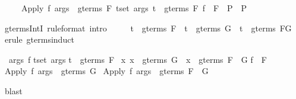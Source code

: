\begin{isabellebody}
\begin{isamarkuptext}
\begin{isabelle}%
\ \ \ \ \ {\isasymlbrakk}Apply\ f\ args\ {\isasymin}\ gterms\ F{\isacharsemicolon}\ {\isasymlbrakk}{\isasymforall}t{\isasymin}set\ args{\isachardot}\ t\ {\isasymin}\ gterms\ F{\isacharsemicolon}\ f\ {\isasymin}\ F{\isasymrbrakk}\ {\isasymLongrightarrow}\ P{\isasymrbrakk}\ {\isasymLongrightarrow}\ P%
\end{isabelle}
%
\end{isamarkuptext}%
\isamarkuptrue%
\isamarkupfalse%
\ gterms{\isacharunderscore}IntI\ {\isacharbrackleft}rule{\isacharunderscore}format{\isacharcomma}\ intro{\isacharbang}{\isacharbrackright}{\isacharcolon}\isanewline
\ \ \ \ \ {\isachardoublequoteopen}t\ {\isasymin}\ gterms\ F\ {\isasymLongrightarrow}\ t\ {\isasymin}\ gterms\ G\ {\isasymlongrightarrow}\ t\ {\isasymin}\ gterms\ {\isacharparenleft}F{\isasyminter}G{\isacharparenright}{\isachardoublequoteclose}\isanewline
%
\isadelimproof
%
\endisadelimproof
%
\isatagproof
{}\isamarkupfalse%
\ {\isacharparenleft}erule\ gterms{\isachardot}induct{\isacharparenright}%
\begin{isamarkuptxt}%
\begin{isabelle}%
\ {}{\isachardot}\ {\isasymAnd}args\ f{\isachardot}\isanewline
{}t{\isasymin}set\ args{\isachardot}\isanewline
{}t\ {\isasymin}\ gterms\ F\ {\isasyminter}\isanewline
{}x{\isachardot}\ x\ {\isasymin}\ gterms\ G\ {\isasymlongrightarrow}\ x\ {\isasymin}\ gterms\ {\isacharparenleft}F\ {\isasyminter}\ G{\isacharparenright}{\isacharbraceright}{\isacharsemicolon}\isanewline
{}f\ {\isasymin}\ F{\isasymrbrakk}\isanewline
{}\ Apply\ f\ args\ {\isasymin}\ gterms\ G\ {\isasymlongrightarrow}\isanewline
{}Apply\ f\ args\ {\isasymin}\ gterms\ {\isacharparenleft}F\ {\isasyminter}\ G{\isacharparenright}%
\end{isabelle}%
\end{isamarkuptxt}%
\isamarkuptrue%
\isamarkupfalse%
\ blast\isanewline
{}\isamarkupfalse%
%
\endisatagproof
{\isafoldproof}%
%
\isadelimproof
%
\endisadelimproof
%
\begin{isamarkuptext}%

\end{isamarkuptext}
\end{isabellebody}
